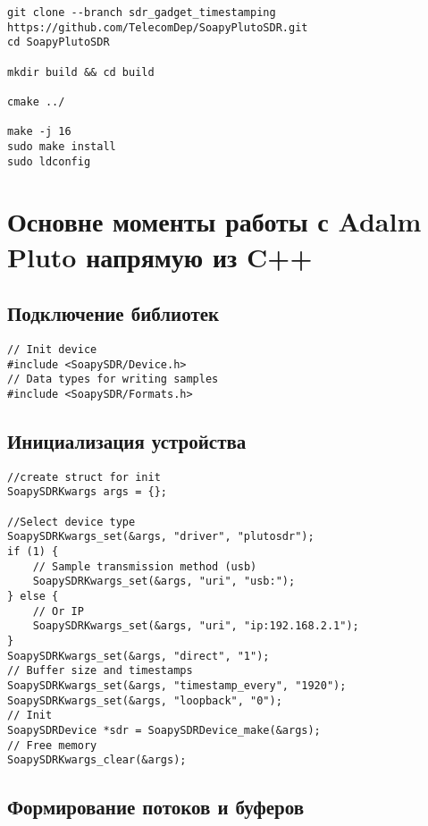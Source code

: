 \begin{lstlisting}
git clone --branch sdr_gadget_timestamping https://github.com/TelecomDep/SoapyPlutoSDR.git
cd SoapyPlutoSDR

mkdir build && cd build

cmake ../

make -j 16
sudo make install
sudo ldconfig
\end{lstlisting}

\section*{\textbf{Основне моменты работы с Adalm Pluto напрямую из C++}}

\subsection*{\textbf{Подключение библиотек}}

\begin{lstlisting}
// Init device
#include <SoapySDR/Device.h>  
// Data types for writing samples 
#include <SoapySDR/Formats.h>  
\end{lstlisting}

\subsection*{\textbf{Инициализация устройства}}

\begin{lstlisting}
//create struct for init
SoapySDRKwargs args = {};

//Select device type
SoapySDRKwargs_set(&args, "driver", "plutosdr");       
if (1) {
    // Sample transmission method (usb)
    SoapySDRKwargs_set(&args, "uri", "usb:");           
} else {
    // Or IP
    SoapySDRKwargs_set(&args, "uri", "ip:192.168.2.1"); 
}
SoapySDRKwargs_set(&args, "direct", "1");
// Buffer size and timestamps              
SoapySDRKwargs_set(&args, "timestamp_every", "1920");  
SoapySDRKwargs_set(&args, "loopback", "0");
// Init             
SoapySDRDevice *sdr = SoapySDRDevice_make(&args);    
// Free memory   
SoapySDRKwargs_clear(&args);
\end{lstlisting}

\subsection*{\textbf{Формирование потоков и буферов}}

